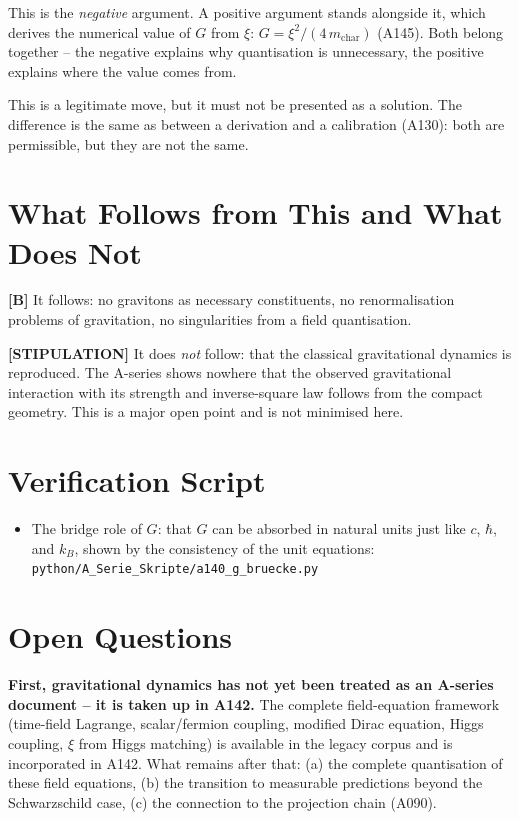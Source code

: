 This is the \emph{negative} argument. A positive argument stands alongside it,
which derives the numerical value of $G$ from $\xi$: $G=\xi^2/(4\,m_\text{char})$
(A145). Both belong together -- the negative explains why quantisation is
unnecessary, the positive explains where the value comes from.

This is a legitimate move, but it must not be presented as a solution. The
difference is the same as between a derivation and a calibration (A130): both are
permissible, but they are not the same.

\section{What Follows from This and What Does Not}

\textbf{[B]} It follows: no gravitons as necessary constituents, no
renormalisation problems of gravitation, no singularities from a field quantisation.

\textbf{[STIPULATION]} It does \emph{not} follow: that the classical gravitational
dynamics is reproduced. The A-series shows nowhere that the observed gravitational
interaction with its strength and inverse-square law follows from the compact
geometry. This is a major open point and is not minimised here.

\section{Verification Script}

\begin{itemize}
  \item The bridge role of $G$: that $G$ can be absorbed in natural units just
    like $c$, $\hbar$, and $k_B$, shown by the consistency of the unit equations:
    \texttt{python/A\_Serie\_Skripte/a140\_g\_bruecke.py}
\end{itemize}

\section{Open Questions}

\textbf{First, gravitational dynamics has not yet been treated as an A-series
document -- it is taken up in A142.} The complete field-equation framework
(time-field Lagrange, scalar/fermion coupling, modified Dirac equation, Higgs
coupling, $\xi$ from Higgs matching) is available in the legacy corpus and is
incorporated in A142. What remains after that: (a) the complete quantisation of
these field equations, (b) the transition to measurable predictions beyond the
Schwarzschild case, (c) the connection to the projection chain (A090).

